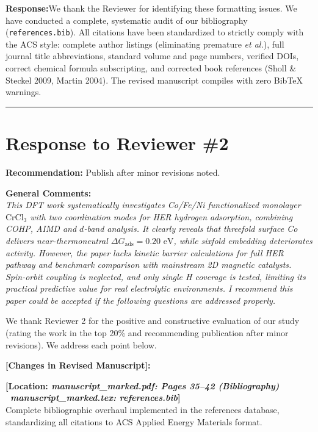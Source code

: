 \documentclass[11pt, sans, a4paper]{moderncv}
\newcommand{\response}{\vspace{0.4em}\noindent\textbf{\color{actionblue}Response:}\hspace{0.5em}}
\newcommand{\manuscriptchange}[1]{{\renewcommand{\label}[1]{}\vspace{0.4em}\noindent\textbf{\color{acsblue}[Changes in Revised Manuscript]:}\par\nopagebreak\vspace{0.15em}#1\vspace{0.4em}}}
\begin{document}
\response We thank the Reviewer for identifying these formatting issues. We have conducted a complete, systematic audit of our bibliography (\texttt{references.bib}). All citations have been standardized to strictly comply with the ACS style: complete author listings (eliminating premature \textit{et al.}), full journal title abbreviations, standard volume and page numbers, verified DOIs, correct chemical formula subscripting, and corrected book references (Sholl \& Steckel 2009, Martin 2004). The revised manuscript compiles with zero BibTeX warnings.

\vspace{1.5em}
\noindent\rule{\textwidth}{0.6pt}

\newpage

\section{Response to Reviewer \#2}

\noindent\textbf{Recommendation:} Publish after minor revisions noted.

\vspace{0.5em}
\noindent\textbf{General Comments:}\\
\textit{This DFT work systematically investigates Co/Fe/Ni functionalized monolayer $\text{CrCl}_3$ with two coordination modes for HER hydrogen adsorption, combining COHP, AIMD and $d$-band analysis. It clearly reveals that threefold surface Co delivers near-thermoneutral $\Delta G_{\mathrm{ads}}=0.20\text{ eV}$, while sixfold embedding deteriorates activity. However, the paper lacks kinetic barrier calculations for full HER pathway and benchmark comparison with mainstream 2D magnetic catalysts. Spin-orbit coupling is neglected, and only single H coverage is tested, limiting its practical predictive value for real electrolytic environments. I recommend this paper could be accepted if the following questions are addressed properly.}

\vspace{0.5em}
\noindent We thank Reviewer 2 for the positive and constructive evaluation of our study (rating the work in the top 20\% and recommending publication after minor revisions). We address each point below.

\manuscriptchange{\textbf{[Location: \textit{manuscript\_marked.pdf: Pages 35--42 (Bibliography)} \textbar\ \textit{manuscript\_marked.tex: references.bib}]}\\ Complete bibliographic overhaul implemented in the references database, standardizing all citations to ACS Applied Energy Materials format.}
\end{document}
